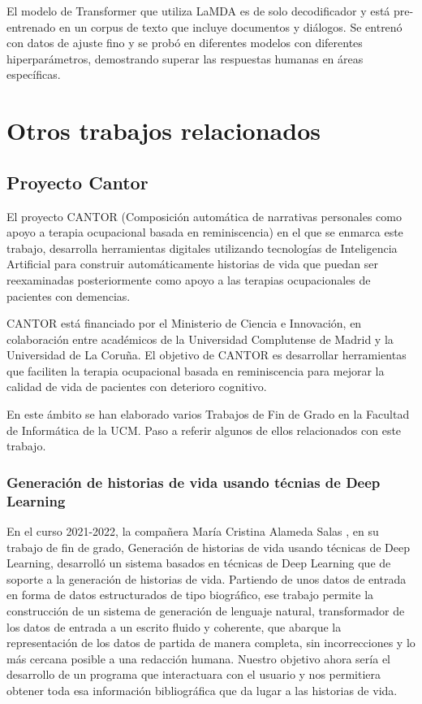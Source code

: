 El modelo de Transformer que utiliza LaMDA es de solo decodificador y está pre-entrenado en un corpus de texto que incluye documentos y diálogos. Se entrenó con datos de ajuste fino y se probó en diferentes modelos con diferentes hiperparámetros, demostrando superar las respuestas humanas en áreas específicas.

\section{Otros trabajos relacionados}
\subsection{Proyecto Cantor}
El proyecto CANTOR (Composición automática de narrativas personales como apoyo a terapia ocupacional basada en reminiscencia) en el que se enmarca este trabajo, desarrolla herramientas digitales utilizando tecnologías de Inteligencia Artificial para construir automáticamente historias de vida que puedan ser reexaminadas posteriormente como apoyo a las terapias ocupacionales de pacientes con demencias.

CANTOR está financiado por el Ministerio de Ciencia e Innovación, en colaboración entre académicos de la Universidad Complutense de Madrid y la Universidad de La Coruña. El objetivo de CANTOR es desarrollar herramientas que faciliten la terapia ocupacional basada en reminiscencia para mejorar la calidad de vida de pacientes con deterioro cognitivo.

En este ámbito se han elaborado varios Trabajos de Fin de Grado en la Facultad de Informática de la UCM. Paso a referir algunos de ellos relacionados con este trabajo. 

\subsubsection{Generación de historias de vida usando técnias de Deep Learning}
En el curso 2021-2022, la compañera María Cristina Alameda Salas \cite{cristinaalameda}, en su trabajo de fin de grado, Generación de historias de vida
usando técnicas de Deep Learning, desarrolló un sistema basados en técnicas
de Deep Learning que de soporte a la generación de historias de vida. Partiendo de unos datos de entrada en forma de datos estructurados de tipo biográfico, ese trabajo permite la construcción de un sistema de generación de lenguaje natural, transformador de los datos de entrada a un escrito fluido y coherente, que abarque la representación de los datos de partida de manera completa, sin incorrecciones y lo más cercana posible a una redacción humana. Nuestro objetivo ahora sería el desarrollo de un programa que interactuara con el usuario y nos permitiera obtener toda esa información bibliográfica que da lugar a las historias de vida. 
